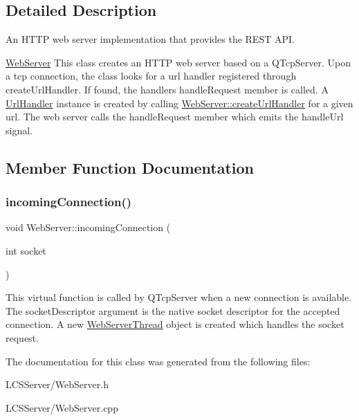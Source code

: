 \subsection{Detailed Description}
An H\+T\+TP web server implementation that provides the R\+E\+ST A\+PI. 

\hyperlink{class_web_server}{Web\+Server} This class creates an H\+T\+TP web server based on a Q\+Tcp\+Server. Upon a tcp connection, the class looks for a url handler registered through create\+Url\+Handler. If found, the handler\textquotesingle{}s handle\+Request member is called. A \hyperlink{class_url_handler}{Url\+Handler} instance is created by calling \hyperlink{class_web_server_a991ba62e7d4044e2f85fe1457aa5bad4}{Web\+Server\+::create\+Url\+Handler} for a given url. The web server calls the handle\+Request member which emits the handle\+Url signal. 

\subsection{Member Function Documentation}
\mbox{\label{class_web_server_ac6a3155a785e42fec310e8457a12d73e}} 
\subsubsection{\texorpdfstring{incoming\+Connection()}{incomingConnection()}}
{\footnotesize\ttfamily void Web\+Server\+::incoming\+Connection (\begin{DoxyParamCaption}\item[{int}]{socket }\end{DoxyParamCaption})}

This virtual function is called by Q\+Tcp\+Server when a new connection is available. The socket\+Descriptor argument is the native socket descriptor for the accepted connection. A new \hyperlink{class_web_server_thread}{Web\+Server\+Thread} object is created which handles the socket request. 

The documentation for this class was generated from the following files\+:\begin{DoxyCompactItemize}
\item 
L\+C\+S\+Server/Web\+Server.\+h\item 
L\+C\+S\+Server/Web\+Server.\+cpp\end{DoxyCompactItemize}
